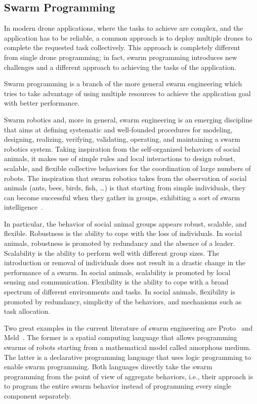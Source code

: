 \subsection{Swarm Programming}\label{subsec:swarm_programming}
In modern drone applications, where the tasks to achieve are complex, and the application has to be reliable, a common approach is 
to deploy multiple drones to complete the requested task collectively. This approach is completely different from single 
drone programming; in fact, swarm programming introduces new challenges and a different approach to achieving the tasks of the application.

Swarm programming is a branch of the more general swarm engineering which tries to take advantage of using multiple resources to 
achieve the application goal with better performance.

Swarm robotics and, more in general, swarm engineering is an emerging discipline that aims at defining systematic 
and well-founded procedures for modeling, designing, realizing, verifying, validating, operating, and maintaining 
a swarm robotics system. Taking inspiration from the self-organized behaviors of social animals, it makes use of simple 
rules and local interactions to design robust, scalable, and flexible collective behaviors for the coordination of large numbers of robots.
The inspiration that swarm robotics takes from the observation of social animals (ants, bees, birds, fish, …) is that starting from simple individuals,
they can become successful when they gather in groups, exhibiting a sort of swarm intelligence~\cite{bonabeau1999swarm}.

In particular, the behavior of social animal groups appears robust, scalable, and flexible. 
Robustness is the ability to cope with the loss of individuals. 
In social animals, robustness is promoted by redundancy and the absence of a leader. 
Scalability is the ability to perform well with different group sizes. 
The introduction or removal of individuals does not result in a drastic change in the performance of a swarm. 
In social animals, scalability is promoted by local sensing and communication. 
Flexibility is the ability to cope with a broad spectrum of different environments and tasks. 
In social animals, flexibility is promoted by redundancy, simplicity of the behaviors, and mechanisms such as task allocation.

Two great examples in the current literature of swarm engineering are Proto~\cite{bachrach2010proto} and Meld~\cite{ashley2007meld}. 
The former is a spatial computing language that allows programming swarms of robots starting from a mathematical model called amorphous medium.
The latter is a declarative programming language that uses logic programming to enable swarm programming.
Both languages directly take the swarm programming from the point of view of aggregate behaviors, i.e., their approach is to program the entire
swarm behavior instead of programming every single component separately.

